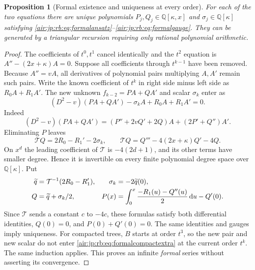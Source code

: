 \documentclass[11pt,letterpaper]{article}
\numberwithin{equation}{section}
\newtheorem{proposition}[theorem]{Proposition}
\theoremstyle{remark}
\newcommand{\Q}{\mathbb{Q}}
\begin{document}
\begin{proposition}[Formal existence and uniqueness at every order]\label{air:jp:rb:prop:formal}
For each of the two equations there are unique polynomials
$P_j,Q_j\in\Q[\kappa,x]$ and $\sigma_j\in\Q[\kappa]$ satisfying \eqref{air:jp:rb:eq:formalansatz}--\eqref{air:jp:rb:eq:formalgauge}. They can be generated by a triangular recursion requiring only rational polynomial arithmetic.
\end{proposition}
\begin{proof}
The coefficients of $t^0,t^1$ cancel identically and the $t^2$ equation is $A''-(2x+\kappa)A=0$. Suppose all coefficients through $t^{k-1}$ have been removed. Because $A''=vA$, all derivatives of polynomial pairs multiplying $A,A'$ remain such pairs. Write the known coefficient of $t^k$ in right side minus left side as $R_0A+R_1A'$. The new unknown $f_{k-2}=PA+QA'$ and scalar $\sigma_k$ enter as
\[
 (D^2-v)(PA+QA')-\sigma_kA+R_0A+R_1A'=0.
\]
Indeed
\[
 (D^2-v)(PA+QA')=(P''+2vQ'+2Q)A+(2P'+Q'')A'.
\]
Eliminating $P$ leaves
\[
 \mathcal TQ=2R_0-R_1'-2\sigma_k,
 \qquad\mathcal TQ=Q'''-4(2x+\kappa)Q'-4Q.
\]
On $x^d$ the leading coefficient of $\mathcal T$ is $-4(2d+1)$, and its other terms have smaller degree. Hence it is invertible on every finite polynomial degree space over $\Q[\kappa]$. Put
\begin{align}
 \widetilde q&=\mathcal T^{-1}(2R_0-R_1'),&
 \sigma_k&=-2\widetilde q(0),\notag\\
 Q&=\widetilde q+\sigma_k/2,&
 P(x)&=\int_0^x\frac{-R_1(u)-Q''(u)}2\,\mathrm d u-Q'(0).\label{air:jp:rb:eq:triangular}
\end{align}
Since $\mathcal T$ sends a constant $c$ to $-4c$, these formulas satisfy both differential identities, $Q(0)=0$, and $P(0)+Q'(0)=0$. The same identities and gauges imply uniqueness.
For compacted trees, $B$ starts at order $t^3$, so the new pair and new scalar do not enter \eqref{air:jp:rb:eq:formalcompactextra} at the current order $t^k$. The same induction applies. This proves an infinite \emph{formal} series without asserting its convergence.
\end{proof}
\end{document}
